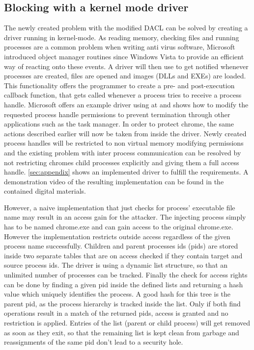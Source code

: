 \subsection{Blocking  with a kernel mode driver}
The newly created problem with the modified DACL can be solved by creating a driver running in kernel-mode. As reading memory, checking files and running processes are a common problem when writing anti virus software, Microsoft introduced object manager routines since Windows Vista to provide an efficient way of reacting onto these events. A driver will then use  to get notified whenever processes are created, files are opened and images (DLLs and EXEs) are loaded. This functionality offers the programmer to create a pre- and post-execution callback function, that gets called whenever a process tries to receive a process handle. Microsoft offers an example driver using  at \cite{github_obcallback} and shows how to modify the requested process handle permissions to prevent termination through other applications such as the task manager. In order to protect chrome, the same actions described earlier will now be taken from inside the driver. Newly created process handles will be restricted to non virtual memory modifying permissions and the existing problem with inter process communication can be resolved by not restricting chromes child processes explicitly and giving them a full access handle. \ref{sec:appendix} shows an implemented driver to fulfill the requirements. A demonstration video of the resulting implementation can be found in the contained digital materials.

However, a naive implementation that just checks for process' executable file name may result in an access gain for the attacker. The injecting process simply has to be named chrome.exe and can gain access to the original chrome.exe. However the implementation restricts outside access regardless of the given process name successfully. Children and parent processes ids (pids) are stored inside two separate tables that are on access checked if they contain target and source process ids. The driver is using a dynamic list structure, so that an unlimited number of processes can be tracked. Finally the check for access rights can be done by finding a given pid inside the defined lists and returning a hash value which uniquely identifies the process. A good hash for this tree is the parent pid, as the process hierarchy is tracked inside the list. Only if both find operations result in a match of the returned pids, access is granted and no restriction is applied. Entries of the list (parent or child process) will get removed as soon as they exit, so that the remaining list is kept clean from garbage and reassignments of the same pid don't lead to a security hole. 

